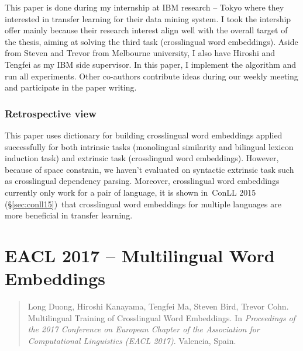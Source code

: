 \documentclass[12pt,twoside,final,hidelinks]{ltthesis}
\theoremstyle{definition}
\newcommand\conllv{ConLL 2015 (\S\ref{sec:conll15})}
\begin{document}
This paper is done during my internship at IBM research -- Tokyo where they interested in transfer learning for their data mining system. I took the 
intership offer mainly because their research interest align well with the overall target of the thesis, aiming at solving the third task (crosslingual 
word embeddings). Aside from Steven and Trevor from Melbourne university, I also have Hiroshi and Tengfei as my IBM side supervisor. In this paper, I implement the algorithm and run all experiments. Other co-authors contribute ideas during our weekly meeting and participate in the paper writing. 

\subsubsection{Retrospective view}
This paper uses dictionary for building crosslingual word embeddings applied successfully for both intrinsic tasks (monolingual similarity and bilingual lexicon
induction task) and extrinsic task (crosslingual word embeddings). However, because of space constrain, we haven't evaluated on syntactic extrinsic task such as 
crosslingual dependency parsing. Moreover, crosslingual word embeddings currently only work for a pair of language, it is shown in~\conllv\ that crosslingual word embeddings for multiple languages are more beneficial in transfer learning. 




\section{EACL 2017 -- Multilingual Word Embeddings}
\label{sec:eacl17}
\begin{quote}
Long Duong, Hiroshi Kanayama, Tengfei Ma, Steven Bird, Trevor Cohn. Multilingual Training of Crosslingual Word Embeddings. In \textit{Proceedings of the 2017 Conference on European Chapter of the Association for Computational Linguistics (EACL 2017)}. Valencia, Spain. 
\end{quote}
\end{document}
